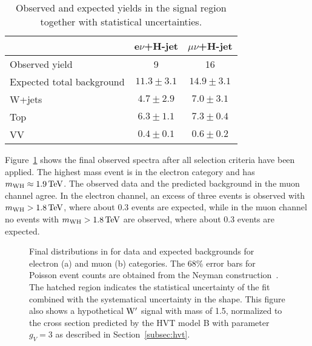 \begin{table}[!htb]
\centering
\caption{
Observed and expected yields in the signal region together with statistical uncertainties.
}
\label{tab:WHExpectedYields}
\begin{tabular}{lcc}
   & e$\nu$+H-jet & {$\mu\nu$+H-jet}   \\
\hline \hline
 Observed yield     & 9   & 16  \\
 Expected total background   & $11.3 \pm 3.1$  & $14.9 \pm 3.1$   \\
\hline
 W+jets   & $4.7 \pm 2.9$  & $7.0 \pm 3.1$   \\
 Top  & $6.3 \pm 1.1$ & $7.3 \pm 0.4$ \\
 VV   & $0.4 \pm 0.1$  & $0.6 \pm 0.2$   \\
\hline \hline
\end{tabular}
\end{table}

Figure~\ref{fig:mWH-final} shows the final observed \mWH spectra after all selection criteria have been applied.
The highest mass event is in the electron category and has $m_{\rm WH} \approx 1.9\,\text{Te\hspace{-.08em}V}$.
The observed data and the predicted background in the muon channel agree.
In the electron channel, an excess of three events is observed with $m_{\rm WH} > 1.8\,\text{Te\hspace{-.08em}V}$, where about 0.3 events are expected,
while in the muon channel no events with $m_{\rm WH} > 1.8\,\text{Te\hspace{-.08em}V}$ are observed, where about 0.3 events are expected.

\begin{figure}[!htb]
\centering
{}
\caption{
Final distributions in \mWH for data and expected backgrounds for electron (a) and muon (b) categories.
The 68\% error bars for Poisson event counts are obtained from the Neyman construction~\cite{Garwood}. The hatched region indicates the statistical uncertainty of the fit combined with the systematical uncertainty in the shape. This figure also shows a hypothetical $\mathrm{W}^\prime$ signal with mass of 1.5\TeV, normalized to the cross section predicted by the HVT model B with parameter $g_V=3$ as described in Section~\ref{subsec:hvt}.
}
\label{fig:mWH-final}
\end{figure}

